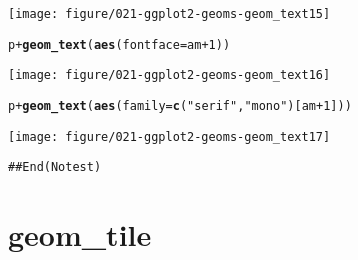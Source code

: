 \documentclass[a4paper,titlepage]{tufte-handout}\usepackage[]{graphicx}\usepackage[]{color}
\makeatletter
\def\maxwidth{ %
  \ifdim\Gin@nat@width>\linewidth
    \linewidth
  \else
    \Gin@nat@width
  \fi
}
\newcommand{\hlnum}[1]{\textcolor[rgb]{0.686,0.059,0.569}{#1}}%
\newcommand{\hlstr}[1]{\textcolor[rgb]{0.192,0.494,0.8}{#1}}%
\newcommand{\hlopt}[1]{\textcolor[rgb]{0,0,0}{#1}}%
\newcommand{\hlstd}[1]{\textcolor[rgb]{0.345,0.345,0.345}{#1}}%
\newcommand{\hlkwc}[1]{\textcolor[rgb]{0.333,0.667,0.333}{#1}}%
\newcommand{\hlkwd}[1]{\textcolor[rgb]{0.737,0.353,0.396}{\textbf{#1}}}%
\newenvironment{kframe}{%
 \def\at@end@of@kframe{}%
 \ifinner\ifhmode%
  \def\at@end@of@kframe{\end{minipage}}%
  \begin{minipage}{\columnwidth}%
 \fi\fi%
 \def\FrameCommand##1{\hskip\@totalleftmargin \hskip-\fboxsep
 \colorbox{shadecolor}{##1}\hskip-\fboxsep
     \hskip-\linewidth \hskip-\@totalleftmargin \hskip\columnwidth}%
 \MakeFramed {\advance\hsize-\width
   \@totalleftmargin\z@ \linewidth\hsize
   \@setminipage}}%
 {\par\unskip\endMakeFramed%
 \at@end@of@kframe}
\newenvironment{knitrout}{}{} %
\makeatother
\begin{document}
\begin{knitrout}
\texttt{[image: figure/021-ggplot2-geoms-geom\_text15]} 
\begin{kframe}\begin{alltt}
\hlstd{p} \hlopt{+} \hlkwd{geom_text}\hlstd{(}\hlkwd{aes}\hlstd{(}\hlkwc{fontface}\hlstd{=am}\hlopt{+}\hlnum{1}\hlstd{))}
\end{alltt}
\end{kframe}
\texttt{[image: figure/021-ggplot2-geoms-geom\_text16]} 
\begin{kframe}\begin{alltt}
\hlstd{p} \hlopt{+} \hlkwd{geom_text}\hlstd{(}\hlkwd{aes}\hlstd{(}\hlkwc{family}\hlstd{=}\hlkwd{c}\hlstd{(}\hlstr{"serif"}\hlstd{,} \hlstr{"mono"}\hlstd{)[am}\hlopt{+}\hlnum{1}\hlstd{]))}
\end{alltt}
\end{kframe}
\texttt{[image: figure/021-ggplot2-geoms-geom\_text17]} 
\begin{kframe}\begin{alltt}
## End(No test)


\end{alltt}
\end{kframe}
\end{knitrout}



\section{geom\_tile}
\end{document}
